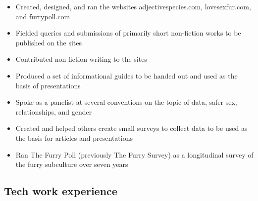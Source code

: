 \documentclass[letterpaper]{memoir}
\begin{document}
\begin{description}
\begin{itemize}
\tightlist
\item
  Created, designed, and ran the websites adjectivespecies.com, lovesexfur.com, and furrypoll.com
\item
  Fielded queries and submissions of primarily short non-fiction works to be published on the sites
\item
  Contributed non-fiction writing to the sites
\item
  Produced a set of informational guides to be handed out and used as the basis of presentations
\item
  Spoke as a panelist at several conventions on the topic of data, safer sex, relationships, and gender
\item
  Created and helped others create small surveys to collect data to be used as the basis for articles and presentations
\item
  Ran The Furry Poll (previously The Furry Survey) as a longitudinal survey of the furry subculture over seven years
\end{itemize}
\end{description}

\newpage

\subsection{Tech work experience}
\end{document}
